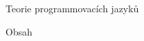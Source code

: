 \nopagenumbers

\tit Teorie programmovacích jazyků
\newpage

\nonum\notoc\sec Obsah
\maketoc
\newpage

\pagenumbers
